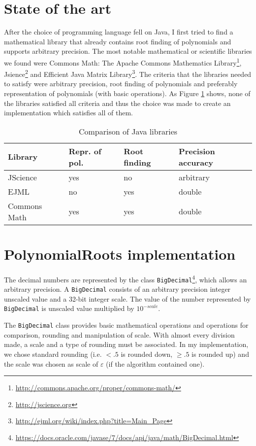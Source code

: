 \documentclass[
  digital, %
  notable,   %
  nolof,     %
  nolot,     %
	final, %
]{fithesis3}
\begin{document}
\section{State of the art}
After the choice of programming language fell on Java, I first tried to find a mathematical library that already contains root finding of polynomials and supports arbitrary precision. The most notable mathematical or scientific libraries we found were Commons Math: The Apache Commons Mathematics Library\footnote{\url{http://commons.apache.org/proper/commons-math/}}, Jsience\footnote{\url{http://jscience.org}} and Efficient Java Matrix Library\footnote{\url{http://ejml.org/wiki/index.php?title=Main_Page}}. The criteria that the libraries needed to satisfy were arbitrary precision, root finding of polynomials and preferably representation of polynomials (with basic operations). As Figure \ref{tab:sota} shows, none of the libraries satisfied all criteria and thus the choice was made to create an implementation which satisfies all of them.

\FloatBarrier
\begin{table}[H]
  \begin{tabular*}{\textwidth}{llll}
    \toprule
    Library & Repr. of pol. & Root finding & Precision accuracy\\
    \midrule
				JScience & yes & no & arbitrary \\
				EJML & no & yes & double \\
				Commons Math & yes & yes & double \\
    \bottomrule
  \end{tabular*}
  \caption{Comparison of Java libraries}
  \label{tab:sota}
\end{table}

\section{PolynomialRoots implementation}
The decimal numbers are represented by the class \texttt{BigDecimal}\footnote{\url{https://docs.oracle.com/javase/7/docs/api/java/math/BigDecimal.html}}, which allows an arbitrary precision. A \texttt{BigDecimal} consists of an arbitrary precision integer unscaled value and a 32-bit integer scale. The value of the number represented by \texttt{BigDecimal} is unscaled value multiplied by $10^{-scale}$.

The \texttt{BigDecimal} class provides basic mathematical operations and operations for comparison, rounding and manipulation of scale. With almost every division made, a scale and a type of rounding must be associated. In my implementation, we chose standard rounding (i.e. $<.5$ is rounded down, $\geq.5$ is rounded up) and the scale was chosen as scale of $\varepsilon$ (if the algorithm contained one).
\end{document}
